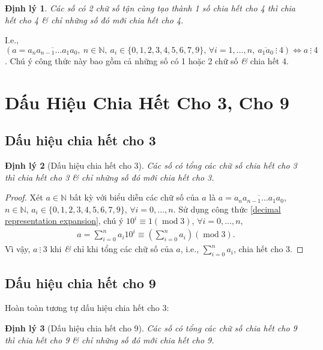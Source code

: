 \documentclass[oneside]{book}
\numberwithin{equation}{section}
\newtheorem{dinhly}{Định lý}[section]
\begin{document}
\begin{dinhly}
	Các số có 2 chữ số tận cùng tạo thành 1 số chia hết cho 4 thì chia hết cho 4 \textit{\&} chỉ những số đó mới chia hết cho 4.
\end{dinhly}
I.e., $(a = \overline{a_na_{n-1}\ldots a_1a_0},\ n\in\mathbb{N},\ a_i\in\{0,1,2,3,4,5,6,7,9\},\,\forall i = 1,\ldots,n,\ \overline{a_1a_0}\ \vdots\ 4)\Leftrightarrow a\ \vdots\ 4$. Chú ý công thức này bao gồm cả những số có 1 hoặc 2 chữ số \textit{\&} chia hết 4.

\section{Dấu Hiệu Chia Hết Cho 3, Cho 9}

\subsection{Dấu hiệu chia hết cho 3}

\begin{dinhly}[Dấu hiệu chia hết cho 3]
	Các số có tổng các chữ số chia hết cho 3 thì chia hết cho 3 \textit{\&} chỉ những số đó mới chia hết cho 3.
\end{dinhly}

\begin{proof}[Proof]
	Xét $a\in\mathbb{N}$ bất kỳ với biểu diễn các chữ số của $a$ là $a = \overline{a_na_{n-1}\ldots a_1a_0}$, $n\in\mathbb{N}$, $a_i\in\{0,1,2,3,4,5,6,7,9\}$, $\forall i = 0,\ldots,n$. Sử dụng công thức \eqref{decimal representation expansion}, chú ý $10^i\equiv 1(\operatorname{mod} 3)$, $\forall i = 0,\ldots,n$,
	\begin{align*}
		a = \sum_{i=0}^n a_i10^i\equiv\left(\sum_{i=0}^n a_i\right)(\operatorname{mod} 3).
	\end{align*}
	Vì vậy, $a\ \vdots\ 3$ khi \textit{\&} chỉ khi tổng các chữ số của $a$, i.e., $\sum_{i=0}^n a_i$, chia hết cho 3.
\end{proof}

\subsection{Dấu hiệu chia hết cho 9}
Hoàn toàn tương tự dấu hiệu chia hết cho 3:

\begin{dinhly}[Dấu hiệu chia hết cho 9]
	Các số có tổng các chữ số chia hết cho 9 thì chia hết cho 9 \textit{\&} chỉ những số đó mới chia hết cho 9.
\end{dinhly}
\end{document}
